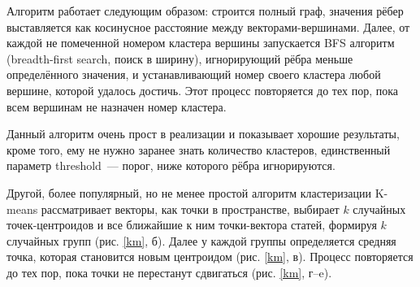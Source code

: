 \documentclass[a4paper, 14pt]{extarticle}
\begin{document}
Алгоритм работает следующим образом: строится полный граф, значения рёбер выставляется как косинусное расстояние между векторами-вершинами. Далее, от каждой не помеченной номером кластера вершины запускается BFS алгоритм (breadth-first search, поиск в ширину), игнорирующий рёбра меньше определённого значения, и устанавливающий номер своего кластера любой вершине, которой удалось достичь. Этот процесс повторяется до тех пор, пока всем вершинам не назначен номер кластера.

Данный алгоритм очень прост в реализации и показывает хорошие результаты, кроме того, ему не нужно заранее знать количество кластеров, единственный параметр threshold~--- порог, ниже которого рёбра игнорируются.


Другой, более популярный, но не менее простой алгоритм кластеризации K-means рассматривает векторы, как точки в пространстве, выбирает $k$ случайных точек-центроидов и все ближайшие к ним точки-вектора статей, формируя $k$ случайных групп  (рис. \ref{km}, б). Далее у каждой группы определяется средняя точка, которая становится новым центроидом (рис. \ref{km}, в). Процесс повторяется до тех пор, пока точки не перестанут сдвигаться (рис. \ref{km}, г--e).
\end{document}
